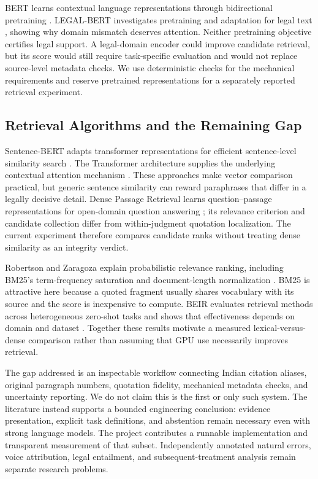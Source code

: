 BERT learns contextual language representations through bidirectional pretraining \cite{ref12}. LEGAL-BERT investigates pretraining and adaptation for legal text \cite{ref14}, showing why domain mismatch deserves attention. Neither pretraining objective certifies legal support. A legal-domain encoder could improve candidate retrieval, but its score would still require task-specific evaluation and would not replace source-level metadata checks. We use deterministic checks for the mechanical requirements and reserve pretrained representations for a separately reported retrieval experiment.

\subsection{Retrieval Algorithms and the Remaining Gap}
Sentence-BERT adapts transformer representations for efficient sentence-level similarity search \cite{ref13}. The Transformer architecture supplies the underlying contextual attention mechanism \cite{ref18}. These approaches make vector comparison practical, but generic sentence similarity can reward paraphrases that differ in a legally decisive detail. Dense Passage Retrieval learns question--passage representations for open-domain question answering \cite{ref16}; its relevance criterion and candidate collection differ from within-judgment quotation localization. The current experiment therefore compares candidate ranks without treating dense similarity as an integrity verdict.

Robertson and Zaragoza explain probabilistic relevance ranking, including BM25's term-frequency saturation and document-length normalization \cite{ref15}. BM25 is attractive here because a quoted fragment usually shares vocabulary with its source and the score is inexpensive to compute. BEIR evaluates retrieval methods across heterogeneous zero-shot tasks and shows that effectiveness depends on domain and dataset \cite{ref17}. Together these results motivate a measured lexical-versus-dense comparison rather than assuming that GPU use necessarily improves retrieval.

The gap addressed is an inspectable workflow connecting Indian citation aliases, original paragraph numbers, quotation fidelity, mechanical metadata checks, and uncertainty reporting. We do not claim this is the first or only such system. The literature instead supports a bounded engineering conclusion: evidence presentation, explicit task definitions, and abstention remain necessary even with strong language models. The project contributes a runnable implementation and transparent measurement of that subset. Independently annotated natural errors, voice attribution, legal entailment, and subsequent-treatment analysis remain separate research problems.

